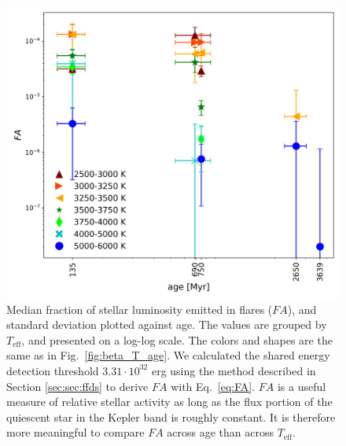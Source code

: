 \documentclass{aa}
\begin{document}
\begin{figure}[ht!]
    \centering
    \includegraphics[width=\hsize]{pics/FA/FA_T_age_Ethresh.png}
    \caption{Median fraction of stellar luminosity emitted in flares ($FA$), and standard deviation plotted against age. The values are grouped by $T_\mathrm{eff}$, and presented on a log-log scale. The colors and shapes are the same as in Fig.~\ref{fig:beta_T_age}. We calculated the shared energy detection threshold $3.31\cdot 10^{32}$ erg using the method described in Section \ref{sec:sec:ffds} to derive $FA$ with Eq.~\ref{eq:FA}. $FA$ is a useful measure of relative stellar activity as long as the flux portion of the quiescent star in the Kepler band is roughly constant. It is therefore more meaningful to compare $FA$ across age than across $T_\mathrm{eff}$.}   
    \label{fig:FA}
\end{figure}
\end{document}
